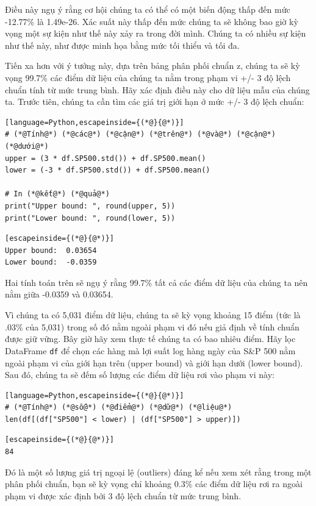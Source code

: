 Điều này ngụ ý rằng cơ hội chúng ta có thể có một biến động thấp đến mức -12.77\% là 1.49e-26. Xác suất này thấp đến mức chúng ta sẽ không bao giờ kỳ vọng một sự kiện như thế này xảy ra trong đời mình. Chúng ta có nhiều sự kiện như thế này, như được minh họa bằng mức tối thiểu và tối đa.

Tiến xa hơn với ý tưởng này, dựa trên bảng phân phối chuẩn z, chúng ta sẽ kỳ vọng 99.7\% các điểm dữ liệu của chúng ta nằm trong phạm vi +/- 3 độ lệch chuẩn tính từ mức trung bình. Hãy xác định điều này cho dữ liệu mẫu của chúng ta. Trước tiên, chúng ta cần tìm các giá trị giới hạn ở mức +/- 3 độ lệch chuẩn:

\begin{lstlisting}[language=Python,escapeinside={(*@}{@*)}]
# (*@Tính@*) (*@các@*) (*@cận@*) (*@trên@*) (*@và@*) (*@cận@*) (*@dưới@*)
upper = (3 * df.SP500.std()) + df.SP500.mean()
lower = (-3 * df.SP500.std()) + df.SP500.mean()

# In (*@kết@*) (*@quả@*)
print("Upper bound: ", round(upper, 5))
print("Lower bound: ", round(lower, 5))
\end{lstlisting}

\begin{lstlisting}[escapeinside={(*@}{@*)}]
Upper bound:  0.03654
Lower bound:  -0.0359
\end{lstlisting}

Hai tính toán trên sẽ ngụ ý rằng 99.7\% tất cả các điểm dữ liệu của chúng ta nên nằm giữa -0.0359 và 0.03654.

Vì chúng ta có 5,031 điểm dữ liệu, chúng ta sẽ kỳ vọng khoảng 15 điểm (tức là .03\% của 5,031)  trong số đó nằm ngoài phạm vi đó nếu giả định về tính chuẩn được giữ vững. Bây giờ hãy xem thực tế chúng ta có bao nhiêu điểm. Hãy lọc DataFrame \texttt{df} để chọn các hàng mà lợi suất log hàng ngày của S\&P 500 nằm ngoài phạm vi của giới hạn trên (upper bound) và giới hạn dưới (lower bound). Sau đó, chúng ta sẽ đếm số lượng các điểm dữ liệu rơi vào phạm vi này:

\begin{lstlisting}[language=Python,escapeinside={(*@}{@*)}]
# (*@Tính@*) (*@số@*) (*@điểm@*) (*@dữ@*) (*@liệu@*)
len(df[(df["SP500"] < lower) | (df["SP500"] > upper)])
\end{lstlisting}

\begin{lstlisting}[escapeinside={(*@}{@*)}]
84
\end{lstlisting}

Đó là một số lượng giá trị ngoại lệ (outliers) đáng kể nếu xem xét rằng trong một phân phối chuẩn, bạn sẽ kỳ vọng chỉ khoảng 0.3\% các điểm dữ liệu rơi ra ngoài phạm vi được xác định bởi 3 độ lệch chuẩn từ mức trung bình.

